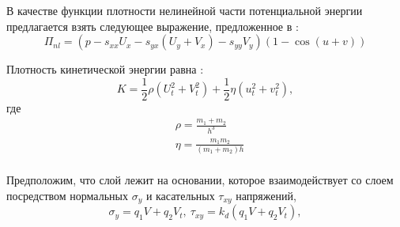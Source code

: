 
В качестве функции плотности нелинейной части потенциальной энергии предлагается взять следующее выражение, предложенное в \cite{bound_aeroplane, bound_porsp17}:
\begin{equation}
	\Pi_{nl} = \left( p - s_{xx} U_x - s_{yx} \left( U_y + V_x\right) - s_{yy} V_y\right) \left( 1- \cos{(u+v)}\right) \label{pot}
\end{equation}

Плотность кинетической энергии равна \cite{bound_porsp17}:
\begin{equation}
	K = \frac{1}{2} \rho (U_t^2 + V_t^2) + \frac{1}{2} \eta (u_t^2 + v_t^2), \label{kin}
\end{equation}
где
\begin{equation}
	\begin{aligned}
		& \rho = \frac{m_1+m_2}{h^3} \\ 
		& \eta = \frac{m_1 m_2}{(m_1 + m_2)h} \\
	\end{aligned}
\end{equation}

Предположим, что слой лежит на основании, которое взаимодействует со слоем посредством нормальных $\sigma_y$ и касательных $\tau_{xy}$ напряжений,
\begin{equation}
	\sigma_{y}=q_1 V + q_2 V_t , ~
	\tau_{xy}= k_d (q_1 V + q_2 V_t), \label{friction}
\end{equation}

